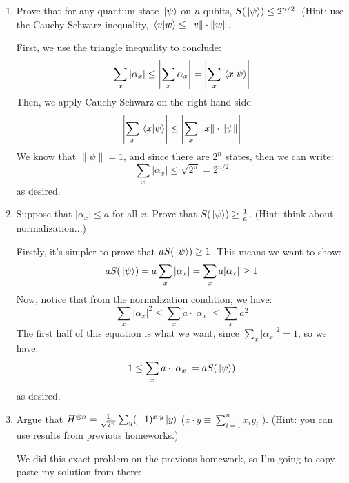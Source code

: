 \documentclass[10pt]{article}
\begin{document}
	\begin{enumerate}[label=\alph*)]
		\item Prove that for any quantum state \( \ket*{\psi} \) on \( n \) qubits, 
			\( S(\ket*{\psi}) \le  2^{n / 2} \). (Hint: use the Cauchy-Schwarz inequality, 
			\( \braket*{v}{w} \le \|v\| \cdot \|w\| \). 

			\begin{solution}
				First, we use the triangle inequality to conclude:
				\[
				\sum_x |\alpha_x| \le \left| \sum_x \alpha_x \right|  = \left| \sum_x \braket*{x}{\psi} \right| 
				\] 
				Then, we apply Cauchy-Schwarz on the right hand side: 
				\[
				\left| \sum_x \braket*{x}{\psi} \right| \le \left| \sum_x \|x\| \cdot \|\psi\| \right| 
				\] 
				We know that \( \|\psi\| = 1 \), and since there are \( 2^{n} \) states, then we can write: 
				\[
				\sum_x |\alpha_x| \le \sqrt{2^{n}} = 2^{n / 2}
				\] 
				as desired. 
			\end{solution}
		\item Suppose that \( |\alpha_x| \le  a \) for all \( x \). Prove that \( S(\ket*{\psi}) \ge \frac{1}{a} \). 
			(Hint: think about normalization...)

			\begin{solution}
				Firstly, it's simpler to prove that \( a S(\ket*{\psi}) \ge 1 \). This means we want to 
				show:
				\[
				aS(\ket*{\psi}) = a \sum_x |\alpha_x| = \sum_x a |\alpha_x| \ge 1
				\] 
				Now, notice that from the normalization condition, we have:
				\[
				\sum_x |\alpha_x|^2 \le  \sum_x a \cdot |\alpha_x| \le  \sum_x a^2
				\] 
				The first half of this equation is what we want, since \( \sum_x|\alpha_x|^2 = 1 \), so we have:
				\[
				1 \le \sum_x a \cdot |\alpha_x| = aS(\ket*{\psi})
				\] 
				as desired.
			\end{solution}
		\item Argue that \( H^{\otimes n} = \frac{1}{\sqrt{2^{n}} }\sum_y (-1)^{x \cdot y} \ket*{y} \) 
			(\( x \cdot y \equiv \sum_{i = 1}^{n}x_i y_i \) ). (Hint: you can use results from previous 
			homeworks.)

			\begin{solution}
				We did this exact problem on the previous homework, so I'm going to copy-paste my solution 
				from there: 


\end{solution}
\end{enumerate}
\end{document}
